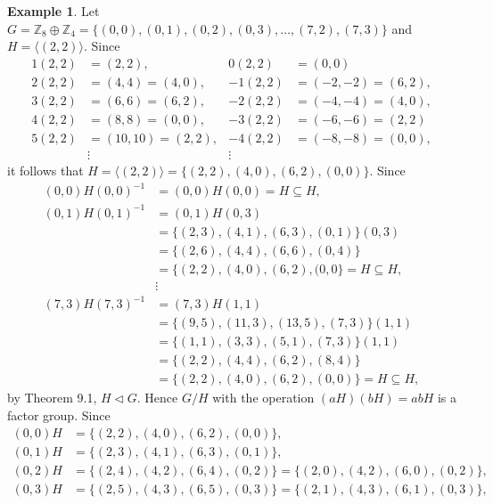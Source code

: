 \documentclass{article}
\theoremstyle{definition}
\newtheorem{example}{Example}[section]
\begin{document}
     \begin{example}
        Let $G = \mathbb{Z}_8 \oplus \mathbb{Z}_4 = \{(0,0),(0,1),(0,2),(0,3),\dots,(7,2),(7,3)\}$ and $H = \langle (2,2) \rangle$. Since
        \begin{align*}
            1(2,2) &= (2,2), & 0(2,2) &= (0,0) \\
            2(2,2) &= (4,4) = (4,0), & -1(2,2) &= (-2,-2) = (6,2), \\
            3(2,2) &= (6,6) = (6,2), & -2(2,2) &= (-4,-4) = (4,0), \\
            4(2,2) &= (8,8) = (0,0), & -3(2,2) &= (-6,-6) = (2,2) \\
            5(2,2) &= (10,10) = (2,2), & -4(2,2) &= (-8,-8) = (0,0), \\
            & \vdots & \vdots
        \end{align*}
        it follows that $H = \langle (2,2) \rangle = \{(2,2),(4,0),(6,2),(0,0)\}$. Since
        \begin{align*}
            (0,0)H(0,0)^{-1} &= (0,0)H(0,0) = H \subseteq H, \\
            (0,1)H(0,1)^{-1} &= (0,1)H(0,3) \\
            &= \{(2,3),(4,1),(6,3),(0,1)\}(0,3) \\
            &=\{(2,6),(4,4),(6,6),(0,4)\} \\
            &=\{(2,2),(4,0),(6,2),(0,0\} = H \subseteq H, \\
            & \vdots \\
            (7,3)H(7,3)^{-1} &= (7,3)H(1,1) \\
            &= \{(9,5),(11,3),(13,5),(7,3)\}(1,1) \\
            &= \{(1,1),(3,3),(5,1),(7,3)\}(1,1) \\
            &= \{(2,2),(4,4),(6,2),(8,4)\} \\
            &= \{(2,2),(4,0),(6,2),(0,0)\} = H \subseteq H,
        \end{align*}
        by Theorem 9.1, $H \lhd G$. Hence $G/H$ with the operation $(aH)(bH) = abH$ is a factor group. Since
        \begin{align*}
            (0,0)H &= \{(2,2),(4,0),(6,2),(0,0)\}, \\
            (0,1)H &= \{(2,3),(4,1),(6,3),(0,1)\}, \\
            (0,2)H &= \{(2,4),(4,2),(6,4),(0,2)\} = \{(2,0),(4,2),(6,0),(0,2)\}, \\
            (0,3)H &= \{(2,5),(4,3),(6,5),(0,3)\} = \{(2,1),(4,3),(6,1),(0,3)\}, \\

\end{align*}
\end{example}
\end{document}
